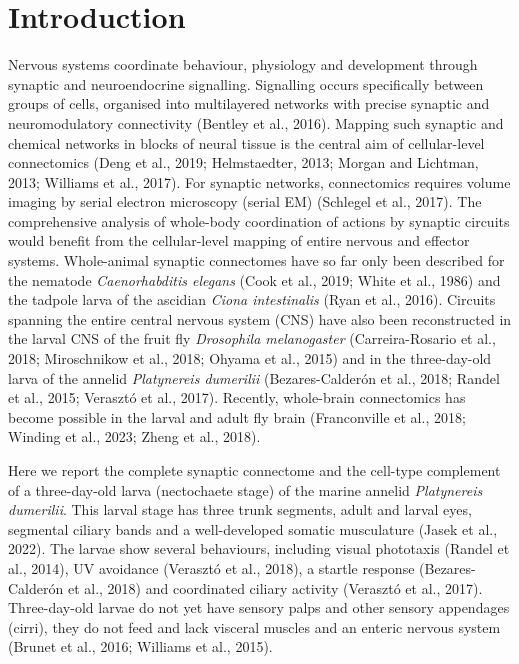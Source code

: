 \documentclass[
  11pt,
]{article}
\begin{document}
\section{Introduction}\label{introduction}

Nervous systems coordinate behaviour, physiology and development through
synaptic and neuroendocrine signalling. Signalling occurs specifically
between groups of cells, organised into multilayered networks with
precise synaptic and neuromodulatory connectivity (Bentley et al.,
2016). Mapping such synaptic and chemical networks in blocks of neural
tissue is the central aim of cellular-level connectomics (Deng et al.,
2019; Helmstaedter, 2013; Morgan and Lichtman, 2013; Williams et al.,
2017). For synaptic networks, connectomics requires volume imaging by
serial electron microscopy (serial EM) (Schlegel et al., 2017). The
comprehensive analysis of whole-body coordination of actions by synaptic
circuits would benefit from the cellular-level mapping of entire nervous
and effector systems. Whole-animal synaptic connectomes have so far only
been described for the nematode \emph{Caenorhabditis elegans} (Cook et
al., 2019; White et al., 1986) and the tadpole larva of the ascidian
\emph{Ciona intestinalis} (Ryan et al., 2016). Circuits spanning the
entire central nervous system (CNS) have also been reconstructed in the
larval CNS of the fruit fly \emph{Drosophila melanogaster}
(Carreira-Rosario et al., 2018; Miroschnikow et al., 2018; Ohyama et
al., 2015) and in the three-day-old larva of the annelid
\emph{Platynereis dumerilii} (Bezares-Calderón et al., 2018; Randel et
al., 2015; Verasztó et al., 2017). Recently, whole-brain connectomics
has become possible in the larval and adult fly brain (Franconville et
al., 2018; Winding et al., 2023; Zheng et al., 2018).

Here we report the complete synaptic connectome and the cell-type
complement of a three-day-old larva (nectochaete stage) of the marine
annelid \emph{Platynereis dumerilii}. This larval stage has three trunk
segments, adult and larval eyes, segmental ciliary bands and a
well-developed somatic musculature (Jasek et al., 2022). The larvae show
several behaviours, including visual phototaxis (Randel et al., 2014),
UV avoidance (Verasztó et al., 2018), a startle response
(Bezares-Calderón et al., 2018) and coordinated ciliary activity
(Verasztó et al., 2017). Three-day-old larvae do not yet have sensory
palps and other sensory appendages (cirri), they do not feed and lack
visceral muscles and an enteric nervous system (Brunet et al., 2016;
Williams et al., 2015).
\end{document}
